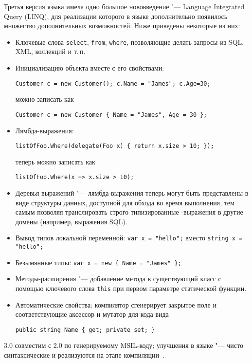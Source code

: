 Третья версия языка имела одно большое нововведение "--- Language Integrated Query (LINQ), для реализации которого в языке дополнительно появилось множество дополнительных возможностей. 
Ниже приведены некоторые из них:
\begin{itemize}
  \item Ключевые слова \lstinline[style=csharpinlinestyle]!select!, \lstinline[style=csharpinlinestyle]!from!, \lstinline[style=csharpinlinestyle]!where!, позволяющие делать запросы из SQL, XML, коллекций и т.\,п.

  \item Инициализацию объекта вместе с его свойствами:
  \begin{lstlisting}[style=csharpinlinestyle]
Customer c = new Customer(); c.Name = "James"; c.Age=30;
  \end{lstlisting}
  можно записать как
  \begin{lstlisting}[style=csharpinlinestyle]
Customer c = new Customer { Name = "James", Age = 30 };
  \end{lstlisting}

  \item Лямбда-выражения:
  \begin{lstlisting}[style=csharpinlinestyle]
listOfFoo.Where(delegate(Foo x) { return x.size > 10; });
  \end{lstlisting}
  теперь можно записать как
  \begin{lstlisting}[style=csharpinlinestyle]
listOfFoo.Where(x => x.size > 10);
  \end{lstlisting}

  \item Деревья выражений "--- лямбда-выражения теперь могут быть представлены в виде структуры данных, доступной для обхода во время выполнения, тем самым позволяя транслировать строго типизированные \csharp{}-выражения в другие домены (например, выражения SQL).

  \item Вывод типов локальной переменной: \lstinline[style=csharpinlinestyle]!var x = "hello";! вместо \lstinline[style=csharpinlinestyle]!string x = "hello";!

  \item Безымянные типы: \lstinline[style=csharpinlinestyle]!var x = new { Name = "James" };!

  \item Методы-расширения "--- добавление метода в существующий класс с помощью ключевого слова \lstinline[style=csharpinlinestyle]!this! при первом параметре статической функции.

  \item Автоматические свойства: компилятор сгенерирует закрытое  поле и соответствующие аксессор и мутатор для кода вида
  \begin{lstlisting}[style=csharpinlinestyle]
public string Name { get; private set; }
  \end{lstlisting}

\end{itemize}
\csharp{} 3.0 совместим с \csharp{} 2.0 по генерируемому MSIL-коду; улучшения в языке "--- чисто синтаксические и реализуются на этапе компиляции~\cite{csharp_wiki_2013_ru}.

